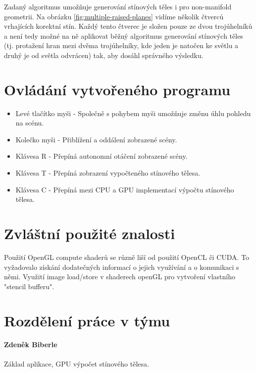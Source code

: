 \documentclass[11pt,a4paper]{article}
\begin{document}
Zadaný algoritmus umožňuje generování stínových těles i pro non-manifold geometrii. Na obrázku \ref{fig:multiple-raised-planes} vidíme několik čtverců vrhajících korektní stín. Každý tento čtverec je složen pouze ze dvou trojúhelníků a není tedy možné na ně aplikovat běžný algoritmus generování stínových těles (tj. protažení hran mezi dvěma trojúhelníky, kde jeden je natočen ke světlu a druhý je od světla odvrácen) tak, aby dosáhl správného výsledku.


\section{Ovládání vytvořeného programu}

\begin{itemize}
	\item Levé tlačítko myši - Společně s pohybem myši umožňuje změnu úhlu pohledu na scénu.
	\item Kolečko myši - Přiblížení a oddálení zobrazené scény.
	\item Klávesa R - Přepíná autonomní otáčení zobrazené scény.
	\item Klávesa T - Přepíná zobrazení vypočteného stínového tělesa.
	\item Klávesa C - Přepíná mezi CPU a GPU implementací výpočtu stínového tělesa.
\end{itemize}

\section{Zvláštní použité znalosti}

Použití OpenGL compute shaderů se různě liší od použití OpenCL či CUDA. To vyžadovalo získání dodatečných informací o jejich využívání a o komunikaci s němi.
Využití image load/store v shaderech openGL pro vytvoření vlastního "stencil bufferu".

\section{Rozdělení práce v týmu}

\paragraph{Zdeněk Biberle} Základ aplikace, GPU výpočet stínového tělesa.
\end{document}
